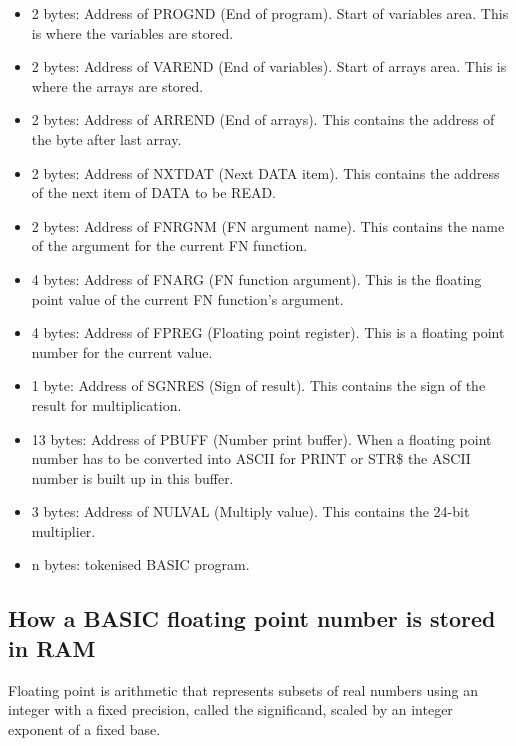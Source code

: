     \begin{itemize}
        \item 2 bytes: Address of PROGND (End of program). Start of variables
            area. This is where the variables are stored.
        \item 2 bytes: Address of VAREND (End of variables). Start of arrays
            area. This is where the arrays are stored.
        \item 2 bytes: Address of ARREND (End of arrays). This contains the
            address of the byte after last array.
        \item 2 bytes: Address of NXTDAT (Next DATA item). This contains the
            address of the next item of DATA to be READ.
        \item 2 bytes: Address of FNRGNM (FN argument name). This contains the
            name of the argument for the current FN function.
        \item 4 bytes: Address of FNARG (FN function argument). This is the
            floating point value of the current FN function's argument.
        \item 4 bytes: Address of FPREG (Floating point register). This is a
            floating point number for the current value.
        \item 1 byte: Address of SGNRES (Sign of result). This contains the sign
            of the result for multiplication.
        \item 13 bytes: Address of PBUFF (Number print buffer). When a floating
            point number has to be converted into ASCII for PRINT or STR\$ the
            ASCII number is built up in this buffer.
        \item 3 bytes: Address of NULVAL (Multiply value). This contains the
            24-bit multiplier.
        \item n bytes: tokenised BASIC program.
    \end{itemize}

    \subsection{How a BASIC floating point number is stored in RAM}

    Floating point is arithmetic that represents subsets of real numbers using
    an integer with a fixed precision, called the significand, scaled by an
    integer exponent of a fixed base.

